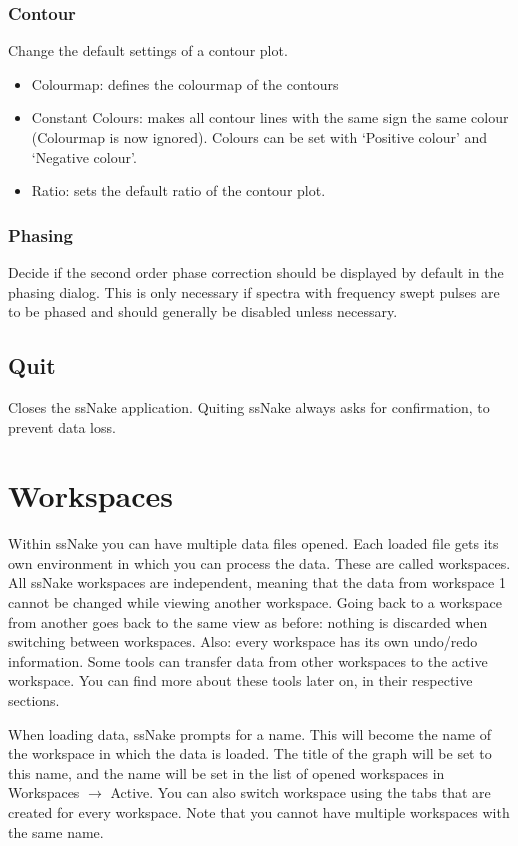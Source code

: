 \documentclass[11pt,a4paper]{article}
\begin{document}
\subsubsection{Contour}
Change the default settings of a contour plot.

\begin{itemize}
  \item Colourmap: defines the colourmap of the contours
  \item Constant Colours: makes all contour lines with the same sign the same colour (Colourmap is now ignored). Colours can be set with `Positive colour' and `Negative colour'.
  \item Ratio: sets the default ratio of the contour plot.
\end{itemize}

\subsubsection{Phasing}
Decide if the second order phase correction should be displayed by default in the phasing dialog. This is only necessary if spectra with frequency swept pulses are to be phased and should generally be disabled unless necessary.

\subsection{Quit}
Closes the ssNake application. Quiting ssNake always asks for confirmation, to prevent data loss.

\section{Workspaces}
Within ssNake you can have multiple data files opened. Each loaded file gets its own environment in which you can process the data. These are called workspaces. All ssNake workspaces are independent, meaning that the data from workspace 1 cannot be changed while viewing another workspace. Going back to a workspace from another goes back to the same view as before:  nothing is discarded when switching between workspaces. Also: every workspace has its own undo/redo information. Some tools can transfer data from other workspaces to the active workspace. You can find more about these tools later on, in their respective sections.

When loading data, ssNake prompts for a name. This will become the name of the workspace in which the data is loaded. The title of the graph will be set to this name, and the name will be set in the list of opened workspaces in Workspaces $\rightarrow$ Active. You can also switch workspace using the tabs that are created for every workspace. Note that you cannot have multiple workspaces with the same name.
\end{document}

